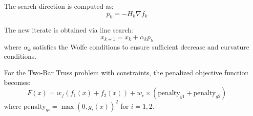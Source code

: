 The search direction is computed as: 
\begin{equation}
p_k = -H_k \nabla f_k
\end{equation}

The new iterate is obtained via line search: 
\begin{equation}
x_{k+1} = x_k + \alpha_k p_k
\end{equation}
where $\alpha_k$ satisfies the Wolfe conditions to ensure sufficient decrease and curvature conditions.

For the Two-Bar Truss problem with constraints, the penalized objective function becomes:
\begin{equation}
F(x) = w_f(f_1(x) + f_2(x)) + w_c \times (\text{penalty}_{g1} + \text{penalty}_{g2})
\end{equation}
where $\text{penalty}_{gi} = \max(0, g_i(x))^2$ for $i = 1, 2$.

